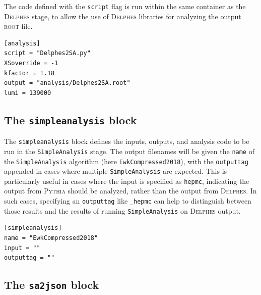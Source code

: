 \documentclass{article}
\newcommand{\simpleanalysis}{\texttt{SimpleAnalysis}}
\newcommand{\pythia}{\textsc{Pythia}}
\newcommand{\delphes}{\textsc{Delphes}}
\newcommand{\ROOT}{\textsc{root}}
\newcommand{\toml}{\textsc{toml}}
\begin{document}
The code defined with the \texttt{script} flag is run within the same container as the \delphes{} stage, to allow the use of \delphes{} libraries for analyzing the output \ROOT{} file.

\begin{listing}[H]
	\begin{verbatim}
[analysis]
script = "Delphes2SA.py"
XSoverride = -1
kfactor = 1.18
output = "analysis/Delphes2SA.root"
lumi = 139000
        \end{verbatim}
	\caption{The \texttt{analysis} block of an example \toml{} configuration file for generating slepton events.}
	\label{slepton-config-analysis}
\end{listing}

\subsection{The \texttt{simpleanalysis} block}
\label{ssec:the-simpleanalysis-block}

The \texttt{simpleanalysis} block defines the inputs, outputs, and analysis code to be run in the \simpleanalysis{} stage.  The output filenames will be given the \texttt{name} of the \simpleanalysis{} algorithm (here \texttt{EwkCompressed2018}), with the \texttt{outputtag} appended in cases where multiple \simpleanalysis{} are expected.  This is particularly useful in cases where the input is specified as \texttt{hepmc}, indicating the output from \pythia{} should be analyzed, rather than the output from \delphes.  In such cases, specifying an \texttt{outputtag} like \texttt{\_hepmc} can help to distinguish between those results and the results of running \simpleanalysis{} on \delphes{} output.

\begin{listing}[H]
	\begin{verbatim}
[simpleanalysis]
name = "EwkCompressed2018"
input = ""
outputtag = ""
        \end{verbatim}
	\caption{The \texttt{simpleanalysis} block of an example \toml{} configuration file for generating slepton events.}
	\label{slepton-config-sa}
\end{listing}

\subsection{The \texttt{sa2json} block}
\label{ssec:the-sa2json-block}
\end{document}
